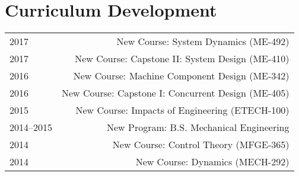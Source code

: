 \section*{Curriculum Development}
\begin{tabular}{L!{\VRule}R}
2017&New Course: System Dynamics (ME-492)\\
2017&New Course: Capstone II: System Design (ME-410)\\
2016&New Course: Machine Component Design (ME-342)\\
2016&New Course: Capstone I: Concurrent Design (ME-405)\\
2015&New Course: Impacts of Engineering (ETECH-100)\\
2014--2015&New Program: B.S. Mechanical Engineering\\
2014&New Course: Control Theory (MFGE-365)\\
2014&New Course: Dynamics (MECH-292)\\
\end{tabular}